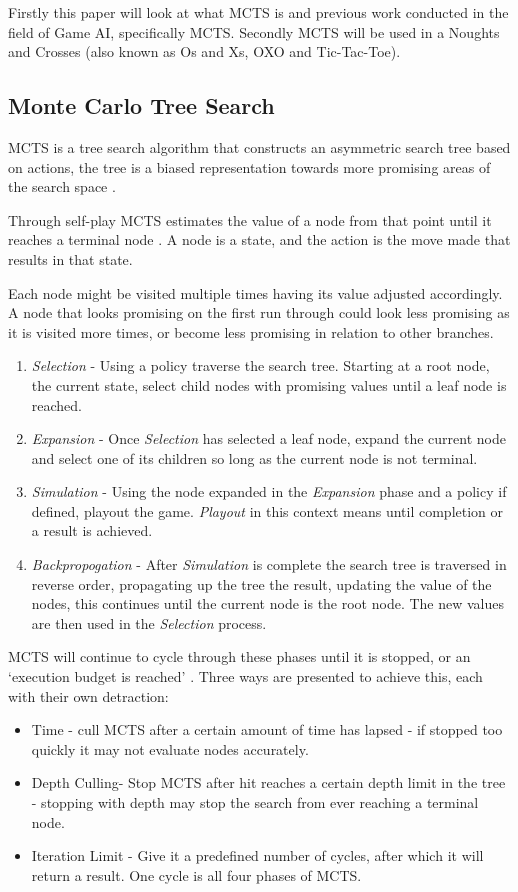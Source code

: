 \documentclass[conference]{IEEEtran}
\begin{document}
Firstly this paper will look at what MCTS is and previous work conducted in the field of Game AI, specifically MCTS. Secondly MCTS will be used in a Noughts and Crosses (also known as Os and Xs, OXO and Tic-Tac-Toe).

\subsection{Monte Carlo Tree Search}
MCTS is a tree search algorithm that constructs an asymmetric search tree based on actions, the tree is a biased representation towards more promising areas of the search space \cite{tinycoop}.

Through self-play MCTS estimates the value of a node from that point until it reaches a terminal node \cite{tinycoop}. A node is a state, and the action is the move made that results in that state.  

Each node might be visited multiple times having its value adjusted accordingly. A node that looks promising on the first run through could look less promising as it is visited more times, or become less promising in relation to other branches. 

\begin{enumerate}
  \item {\em Selection} - Using a policy traverse the search tree. Starting at a root node, the current state, select child nodes with promising values until a leaf node is reached.
  \item {\em Expansion} - Once {\em Selection} has selected a leaf node, expand the current node and select one of its children so long as the current node is not terminal.   
  \item {\em Simulation} - Using the node expanded in the {\em Expansion} phase and a policy if defined, playout the game. {\em Playout} in this context means until completion or a result is achieved.
  \item {\em Backpropogation} - After {\em Simulation} is complete the search tree is traversed in reverse order, propagating up the tree the result, updating the value of the nodes, this continues until the current node is the root node. The new values are then used in the {\em Selection} process.
\end{enumerate}

MCTS will continue to cycle through these phases until it is stopped, or an `execution budget is reached' \cite{rhea}. Three ways are presented to achieve this, each with their own detraction:
\begin{itemize}
  \item Time - cull MCTS after a certain amount of time has lapsed - if stopped too quickly it may not evaluate nodes accurately.
  \item Depth Culling- Stop MCTS after hit reaches a certain depth limit in the tree - stopping with depth may stop the search from ever reaching a terminal node.
  \item Iteration Limit - Give it a predefined number of cycles, after which it will return a result. One cycle is all four phases of MCTS.
\end{itemize}
\end{document}
